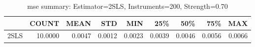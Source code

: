 \begin{table}[ht]
\centering
\caption{mse summary: Estimator=2SLS, Instruments=200, Strength=0.70}
\begin{tabular}{lrrrrrrrr}
\toprule
 & COUNT & MEAN & STD & MIN & 25\% & 50\% & 75\% & MAX \\
\midrule
2SLS & 10.0000 & 0.0047 & 0.0012 & 0.0023 & 0.0039 & 0.0046 & 0.0056 & 0.0066 \\
\bottomrule
\end{tabular}
\end{table}
